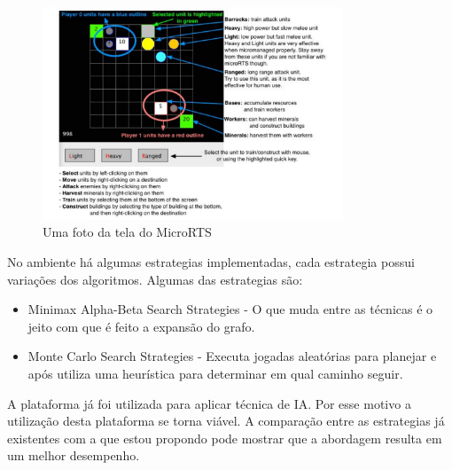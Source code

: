 \begin{figure}[ht]
	\centering
	\includegraphics[width=0.8\textwidth]{fig/microrts.pdf}
	\caption{Uma foto da tela do MicroRTS}
	\label{fig:microrts}
\end{figure} 

No ambiente há algumas estrategias implementadas, cada estrategia possui variações dos algoritmos. Algumas das estrategias são:
\begin{itemize}
	\item Minimax Alpha-Beta Search Strategies - O que muda entre as técnicas é o jeito com que é feito a expansão do grafo.
	\item Monte Carlo Search Strategies - Executa jogadas aleatórias para planejar e após utiliza uma heurística para determinar em qual caminho seguir.
\end{itemize}

A plataforma já foi utilizada para aplicar técnica de IA. Por esse motivo a utilização desta plataforma se torna viável. A comparação entre as estrategias já existentes com a que estou propondo pode mostrar que a
 abordagem resulta em um melhor desempenho. 
